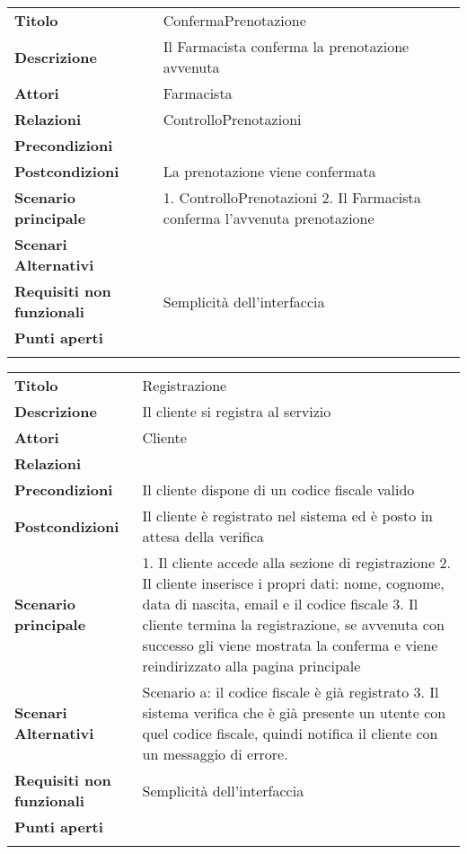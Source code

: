 \begin{longtable}[c]{@{}ll@{}}
\toprule\addlinespace
\textbf{Titolo} & ConfermaPrenotazione
\\\addlinespace
\textbf{Descrizione} & Il Farmacista conferma la prenotazione avvenuta
\\\addlinespace
\textbf{Attori} & Farmacista
\\\addlinespace
\textbf{Relazioni} & ControlloPrenotazioni
\\\addlinespace
\textbf{Precondizioni} &
\\\addlinespace
\textbf{Postcondizioni} & La prenotazione viene confermata
\\\addlinespace
\textbf{Scenario principale} & 1. ControlloPrenotazioni 2. Il Farmacista
conferma l'avvenuta prenotazione
\\\addlinespace
\textbf{Scenari Alternativi} &
\\\addlinespace
\textbf{Requisiti non funzionali} & Semplicità dell'interfaccia
\\\addlinespace
\textbf{Punti aperti} &
\\\addlinespace
\bottomrule
\end{longtable}

\begin{longtable}[c]{@{}ll@{}}
\toprule\addlinespace
\textbf{Titolo} & Registrazione
\\\addlinespace
\textbf{Descrizione} & Il cliente si registra al servizio
\\\addlinespace
\textbf{Attori} & Cliente
\\\addlinespace
\textbf{Relazioni} &
\\\addlinespace
\textbf{Precondizioni} & Il cliente dispone di un codice fiscale valido
\\\addlinespace
\textbf{Postcondizioni} & Il cliente è registrato nel sistema ed è posto
in attesa della verifica
\\\addlinespace
\textbf{Scenario principale} & 1. Il cliente accede alla sezione di
registrazione 2. Il cliente inserisce i propri dati: nome, cognome, data
di nascita, email e il codice fiscale 3. Il cliente termina la
registrazione, se avvenuta con successo gli viene mostrata la conferma e
viene reindirizzato alla pagina principale
\\\addlinespace
\textbf{Scenari Alternativi} & Scenario a: il codice fiscale è già
registrato 3. Il sistema verifica che è già presente un utente con quel
codice fiscale, quindi notifica il cliente con un messaggio di errore.
\\\addlinespace
\textbf{Requisiti non funzionali} & Semplicità dell'interfaccia
\\\addlinespace
\textbf{Punti aperti} &
\\\addlinespace
\bottomrule
\end{longtable}

